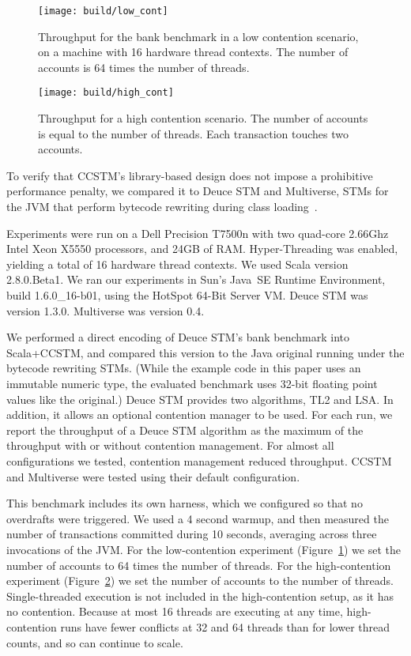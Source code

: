 
\begin{figure}
  \centering \texttt{[image: build/low\_cont]}

\caption{Throughput for the bank benchmark in a low contention scenario,
on a machine with 16 hardware thread contexts.  The number of accounts
is 64 times the number of threads.}

  \label{fig:lowcont}
\end{figure}

\begin{figure}
  \centering \texttt{[image: build/high\_cont]}

\caption{Throughput for a high contention scenario.  The number of accounts is
equal to the number of threads.  Each transaction touches two accounts.}

  \label{fig:highcont}
\end{figure}

To verify that CCSTM's library-based design does not impose a prohibitive
performance penalty, we compared it to Deuce STM and Multiverse, STMs for
the JVM that perform bytecode rewriting during class
loading~\cite{deucestm,multiverse}.

Experiments were run on a Dell Precision T7500n with two quad-core
2.66Ghz Intel Xeon X5550 processors, and 24GB of RAM.  Hyper-Threading was
enabled, yielding a total of 16 hardware thread contexts.  We used Scala
version 2.8.0.Beta1.  We ran our experiments in
Sun's Java~SE Runtime Environment, build 1.6.0\_16-b01, using the HotSpot
64-Bit Server VM.  Deuce STM was version 1.3.0.  Multiverse was version 0.4.

We performed a direct encoding of Deuce STM's bank benchmark into
Scala+CCSTM, and compared this version to the Java original running
under the bytecode rewriting STMs.  (While the example code in this paper uses an
immutable  numeric type, the evaluated benchmark uses 32-bit
floating point values like the original.)  Deuce STM provides two algorithms,
TL2 and LSA.  In addition, it allows an optional contention manager to
be used.  For each run, we report the throughput of a Deuce STM algorithm
as the maximum of the throughput with or without contention management.
For almost all configurations we tested, contention management reduced
throughput.  CCSTM and Multiverse were tested using their default
configuration.

This benchmark includes its own harness, which we configured so
that no overdrafts were triggered.  We used a 4 second warmup, and
then measured the number of transactions committed during 10 seconds,
averaging across three invocations of the JVM.  For the low-contention
experiment (Figure~\ref{fig:lowcont}) we set the number of accounts
to 64 times the number of threads.  For the high-contention experiment
(Figure~\ref{fig:highcont}) we set the number of accounts to the number of
threads.  Single-threaded execution is not included in the high-contention
setup, as it has no contention.  Because at most 16 threads are executing
at any time, high-contention runs have fewer conflicts at 32 and 64
threads than for lower thread counts, and so can continue to scale.

